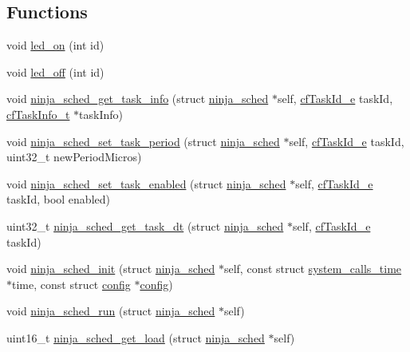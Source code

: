 \subsection*{Functions}
\begin{DoxyCompactItemize}
\item 
void \hyperlink{group__scheduler_ga4a7f2ef4eb60c70033b51343c9e7075a}{led\+\_\+on} (int id)
\item 
void \hyperlink{group__scheduler_ga853f476fe49866f93159854c5f1c8c10}{led\+\_\+off} (int id)
\item 
void \hyperlink{group__scheduler_gae85f23ef60d73fdd618ee739fd87562b}{ninja\+\_\+sched\+\_\+get\+\_\+task\+\_\+info} (struct \hyperlink{structninja__sched}{ninja\+\_\+sched} $\ast$self, \hyperlink{ninja__sched_8h_a7a0ac93d52343c754e212d32d89251bd}{cf\+Task\+Id\+\_\+e} task\+Id, \hyperlink{structcfTaskInfo__t}{cf\+Task\+Info\+\_\+t} $\ast$task\+Info)
\item 
void \hyperlink{group__scheduler_ga544a129125d12cf606dd3eb1186db1ee}{ninja\+\_\+sched\+\_\+set\+\_\+task\+\_\+period} (struct \hyperlink{structninja__sched}{ninja\+\_\+sched} $\ast$self, \hyperlink{ninja__sched_8h_a7a0ac93d52343c754e212d32d89251bd}{cf\+Task\+Id\+\_\+e} task\+Id, uint32\+\_\+t new\+Period\+Micros)
\item 
void \hyperlink{group__scheduler_ga628b2855221fd88d2a4a19d697c0e098}{ninja\+\_\+sched\+\_\+set\+\_\+task\+\_\+enabled} (struct \hyperlink{structninja__sched}{ninja\+\_\+sched} $\ast$self, \hyperlink{ninja__sched_8h_a7a0ac93d52343c754e212d32d89251bd}{cf\+Task\+Id\+\_\+e} task\+Id, bool enabled)
\item 
uint32\+\_\+t \hyperlink{group__scheduler_ga77f20c44eebb8fa7eebbf71dba0e746a}{ninja\+\_\+sched\+\_\+get\+\_\+task\+\_\+dt} (struct \hyperlink{structninja__sched}{ninja\+\_\+sched} $\ast$self, \hyperlink{ninja__sched_8h_a7a0ac93d52343c754e212d32d89251bd}{cf\+Task\+Id\+\_\+e} task\+Id)
\item 
void \hyperlink{group__scheduler_ga7cbd825bfaee512cced8cd01884fdc85}{ninja\+\_\+sched\+\_\+init} (struct \hyperlink{structninja__sched}{ninja\+\_\+sched} $\ast$self, const struct \hyperlink{structsystem__calls__time}{system\+\_\+calls\+\_\+time} $\ast$time, const struct \hyperlink{structconfig}{config} $\ast$\hyperlink{structconfig}{config})
\item 
void \hyperlink{group__scheduler_ga075da98f688a02804e331f837fb5be48}{ninja\+\_\+sched\+\_\+run} (struct \hyperlink{structninja__sched}{ninja\+\_\+sched} $\ast$self)
\item 
uint16\+\_\+t \hyperlink{group__scheduler_ga1d53c3e7f49978b38e33698ed69cb366}{ninja\+\_\+sched\+\_\+get\+\_\+load} (struct \hyperlink{structninja__sched}{ninja\+\_\+sched} $\ast$self)
\end{DoxyCompactItemize}


